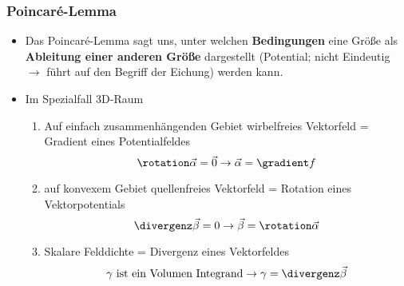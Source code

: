 \begin{frame}
  \frametitle{Poincaré-Lemma}
\begin{itemize}[<+->]
\item Das Poincaré-Lemma sagt uns, unter welchen \textbf{Bedingungen} eine Größe als \textbf{Ableitung einer anderen Größe} dargestellt (Potential; nicht Eindeutig \(\to\) führt auf den Begriff der Eichung) werden kann.
\item Im Spezialfall 3D-Raum
  \begin{enumerate}[<+->]
    \item Auf einfach zusammenhängenden Gebiet wirbelfreies Vektorfeld = Gradient eines Potentialfeldes
      \begin{equation*}
        \rotation \vec{\alpha} =\vec{0} \to \vec{\alpha} = \gradient f
      \end{equation*}
      \item auf konvexem Gebiet quellenfreies Vektorfeld = Rotation eines Vektorpotentials
      \begin{equation*}
        \divergenz \vec{\beta} =0 \to \vec{\beta} = \rotation \vec{\alpha}
      \end{equation*}
      \item Skalare Felddichte = Divergenz eines Vektorfeldes
      \begin{equation*}
        \gamma \text{ ist ein Volumen Integrand} \to \gamma = \divergenz \vec{\beta}
      \end{equation*}

 \end{enumerate}
\end{itemize}
\end{frame}



